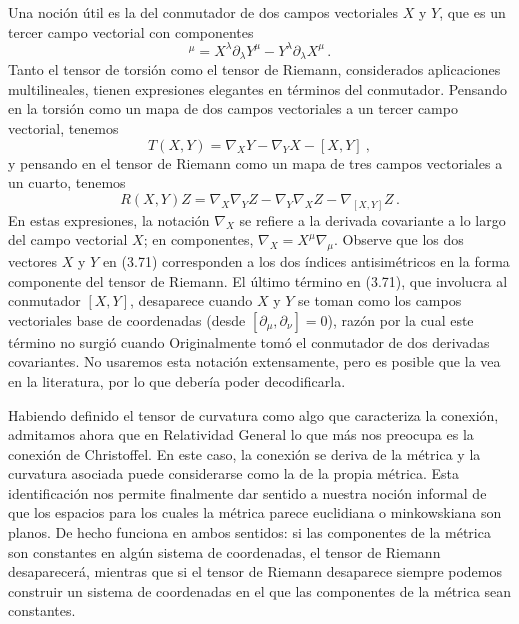 \documentclass[11pt,b5paper,openany,twoside]{book}
\newcommand{\p}[1]{{\partial_{#1}}}
\begin{document}
Una noción útil es la del conmutador de dos campos vectoriales $X$ y $Y$, que es un tercer campo vectorial con componentes
\begin{equation}
[X,Y]^\mu = X^\lambda\p\lambda Y^\mu - Y^\lambda\p\lambda X^\mu\,.
\label{3.69}
\end{equation}
Tanto el tensor de torsión como el tensor de Riemann, considerados aplicaciones multilineales, tienen expresiones elegantes en términos del conmutador.
Pensando en la torsión como un mapa de dos campos vectoriales a un tercer campo vectorial, tenemos
\begin{equation}
T(X,Y) = \nabla_X Y - \nabla_Y X - [X,Y]\ ,\label{3.70}
\end{equation}
y pensando en el tensor de Riemann como un mapa de tres campos vectoriales a un cuarto, tenemos
\begin{equation}
R(X,Y)Z = \nabla_X\nabla_Y Z-\nabla_Y\nabla_X Z
- \nabla_{[X,Y]}Z\,.\label{3.71}
\end{equation}
En estas expresiones, la notación $\nabla_X$ se refiere a la derivada covariante a lo largo del campo vectorial $X$; en componentes, $\nabla_X = X^\mu\nabla_\mu$.
Observe que los dos vectores $X$ y $Y$ en (3.71) corresponden a los dos índices antisimétricos en la forma componente del tensor de Riemann.
El último término en (3.71), que involucra al conmutador $[X,Y]$, desaparece cuando $X$ y $Y$ se toman como los campos vectoriales base de coordenadas (desde $[\p\mu ,\p\nu]=0$), razón por la cual este término no surgió cuando Originalmente tomó el conmutador de dos derivadas covariantes.
No usaremos esta notación extensamente, pero es posible que la vea en la literatura, por lo que debería poder decodificarla.

Habiendo definido el tensor de curvatura como algo que caracteriza la conexión, admitamos ahora que en Relatividad General lo que más nos preocupa es la conexión de Christoffel.
En este caso, la conexión se deriva de la métrica y la curvatura asociada puede considerarse como la de la propia métrica.
Esta identificación nos permite finalmente dar sentido a nuestra noción informal de que los espacios para los cuales la métrica parece euclidiana o minkowskiana son planos.
De hecho funciona en ambos sentidos: si las componentes de la métrica son constantes en algún sistema de coordenadas, el tensor de Riemann desaparecerá, mientras que si el tensor de Riemann desaparece siempre podemos construir un sistema de coordenadas en el que las componentes de la métrica sean constantes.
\end{document}
